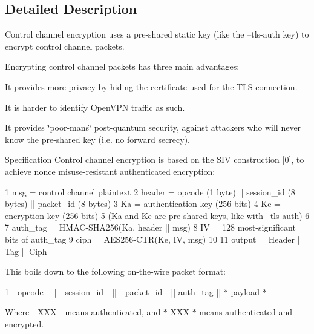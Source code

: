 \subsection{Detailed Description}
\begin{DoxyParagraph}{}
Control channel encryption uses a pre-\/shared static key (like the --tls-\/auth key) to encrypt control channel packets.
\end{DoxyParagraph}
\begin{DoxyParagraph}{}
Encrypting control channel packets has three main advantages\+:
\begin{DoxyItemize}
\item It provides more privacy by hiding the certificate used for the T\+L\+S connection.
\item It is harder to identify Open\+V\+P\+N traffic as such.
\item It provides \char`\"{}poor-\/man\textquotesingle{}s\char`\"{} post-\/quantum security, against attackers who will never know the pre-\/shared key (i.\+e. no forward secrecy).
\end{DoxyItemize}
\end{DoxyParagraph}
\begin{DoxyParagraph}{Specification}
Control channel encryption is based on the S\+I\+V construction \mbox{[}0\mbox{]}, to achieve nonce misuse-\/resistant authenticated encryption\+:
\end{DoxyParagraph}
\begin{DoxyParagraph}{}

\begin{DoxyCode}
1 msg      = control channel plaintext
2 header   = opcode (1 byte) || session\_id (8 bytes) || packet\_id (8 bytes)
3 Ka       = authentication key (256 bits)
4 Ke       = encryption key (256 bits)
5 (Ka and Ke are pre-shared keys, like with --tls-auth)
6 
7 auth\_tag = HMAC-SHA256(Ka, header || msg)
8 IV       = 128 most-significant bits of auth\_tag
9 ciph     = AES256-CTR(Ke, IV, msg)
10 
11 output   = Header || Tag || Ciph
\end{DoxyCode}

\end{DoxyParagraph}
\begin{DoxyParagraph}{}
This boils down to the following on-\/the-\/wire packet format\+:
\end{DoxyParagraph}
\begin{DoxyParagraph}{}

\begin{DoxyCode}
1 - opcode - || - session\_id - || - packet\_id - || auth\_tag || * payload *
\end{DoxyCode}

\end{DoxyParagraph}
\begin{DoxyParagraph}{}
Where {\ttfamily -\/ X\+X\+X -\/} means authenticated, and {\ttfamily $\ast$ X\+X\+X $\ast$} means authenticated and encrypted. 
\end{DoxyParagraph}


